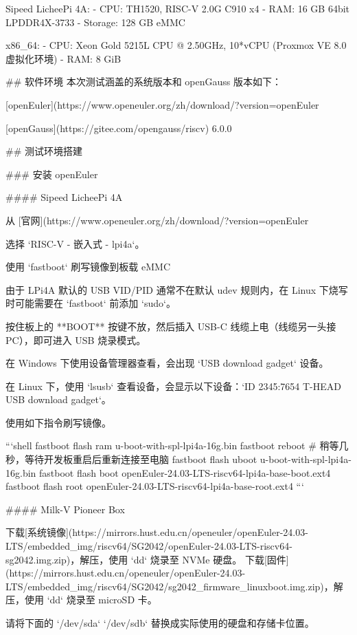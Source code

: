 \documentclass{article}
\begin{document}
\begin{markdown}
Sipeed LicheePi 4A:
- CPU: TH1520, RISC-V 2.0G C910 x4
- RAM: 16 GB 64bit LPDDR4X-3733
- Storage: 128 GB eMMC

x86_64:
- CPU: Xeon Gold 5215L CPU @ 2.50GHz, 10*vCPU (Proxmox VE 8.0 虚拟化环境)
- RAM: 8 GiB

## 软件环境
本次测试涵盖的系统版本和 openGauss 版本如下：

[openEuler](https://www.openeuler.org/zh/download/?version=openEuler%

[openGauss](https://gitee.com/opengauss/riscv) 6.0.0

## 测试环境搭建

### 安装 openEuler

#### Sipeed LicheePi 4A

从 [官网](https://www.openeuler.org/zh/download/?version=openEuler%

选择 `RISC-V - 嵌入式 - lpi4a`。

使用 `fastboot` 刷写镜像到板载 eMMC

由于 LPi4A 默认的 USB VID/PID 通常不在默认 udev 规则内，在 Linux 下烧写时可能需要在 `fastboot` 前添加 `sudo`。

按住板上的 **BOOT** 按键不放，然后插入 USB-C 线缆上电（线缆另一头接 PC），即可进入 USB 烧录模式。

在 Windows 下使用设备管理器查看，会出现 `USB download gadget` 设备。

在 Linux 下，使用 `lsusb` 查看设备，会显示以下设备：`ID 2345:7654 T-HEAD USB download gadget`。

使用如下指令刷写镜像。

```shell
fastboot flash ram u-boot-with-spl-lpi4a-16g.bin
fastboot reboot
# 稍等几秒，等待开发板重启后重新连接至电脑
fastboot flash uboot u-boot-with-spl-lpi4a-16g.bin
fastboot flash boot openEuler-24.03-LTS-riscv64-lpi4a-base-boot.ext4
fastboot flash root openEuler-24.03-LTS-riscv64-lpi4a-base-root.ext4
```

#### Milk-V Pioneer Box

下载[系统镜像](https://mirrors.hust.edu.cn/openeuler/openEuler-24.03-LTS/embedded_img/riscv64/SG2042/openEuler-24.03-LTS-riscv64-sg2042.img.zip)，解压，使用 `dd` 烧录至 NVMe 硬盘。
下载[固件](https://mirrors.hust.edu.cn/openeuler/openEuler-24.03-LTS/embedded_img/riscv64/SG2042/sg2042_firmware_linuxboot.img.zip)，解压，使用 `dd` 烧录至 microSD 卡。

请将下面的 `/dev/sda` `/dev/sdb` 替换成实际使用的硬盘和存储卡位置。


\end{markdown}
\end{document}
